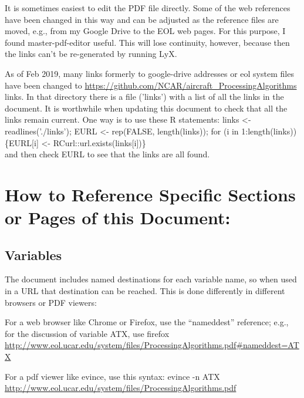 \documentclass[
  english,
]{book}
\begin{document}
\begin{itemize}
  It is sometimes easiest to edit the PDF file directly. Some of the web references have been changed in this way and can be adjusted as the reference files are moved, e.g., from my Google Drive to the EOL web pages. For this purpose, I found master-pdf-editor useful. This will lose continuity, however, because then the links can't be re-generated by running LyX.

  As of Feb 2019, many links formerly to google-drive addresses or eol system files have been changed to \url{https://github.com/NCAR/aircraft_ProcessingAlgorithms} links. In that directory there is a file ('links') with a list of all the links in the document. It is worthwhile when updating this document to check that all the links remain current. One way is to use these R statements:
  links \textless- readlines('./links'); EURL \textless- rep(FALSE, length(links));
  for (i in 1:length(links)) \{EURL{{[}i{]}} \textless- RCurl::url.exists(links{{[}i{]}})\}\\
  and then check EURL to see that the links are all found.
\end{itemize}

\hypertarget{how-to-reference-specific-sections-or-pages-of-this-document}{%
\section*{How to Reference Specific Sections or Pages of this Document:}\label{how-to-reference-specific-sections-or-pages-of-this-document}}

\hypertarget{variables}{%
\subsection*{Variables}\label{variables}}

The document includes named destinations for each variable name, so when used in a URL that destination can be reached. This is done differently in different browsers or PDF viewers:

For a web browser like Chrome or Firefox, use the ``nameddest'' reference; e.g., for the discussion of variable ATX, use
firefox \url{http://www.eol.ucar.edu/system/files/ProcessingAlgorithms.pdf\#nameddest=ATX}

For a pdf viewer like evince, use this syntax:
evince -n ATX \url{http://www.eol.ucar.edu/system/files/ProcessingAlgorithms.pdf}
\end{document}

